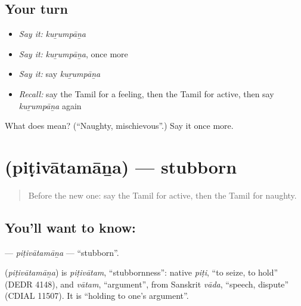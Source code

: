 \subsection*{Your turn}
\begin{itemize}
\raggedright
  \item \emph{Say it:} \emph{kuṟumpāṉa}
  \item \emph{Say it:} \emph{kuṟumpāṉa}, once more
  \item \emph{Say it:} say \emph{kuṟumpāṉa}
  \item \emph{Recall:} say the Tamil for a feeling, then the Tamil for active, then say \emph{kuṟumpāṉa} again
\end{itemize}

\begin{tcolorbox}[breakable,colback=teal!4,colframe=teal!35!black,title={Before you move on}]
What does  mean? (\textquotedblleft{}Naughty, mischievous\textquotedblright{}.) Say it once more.
\end{tcolorbox}
\section[\texorpdfstring{\ta{பிடிவாதமான} (piṭivātamāṉa)}{பிடிவாதமான (piṭivātamāṉa)}]{ (piṭivātamāṉa) — stubborn}

\label{lesson:TA-C180-pitivatamana}



\begin{quote}
Before the new one: say the Tamil for active, then the Tamil for naughty.
\end{quote}

\subsection*{You'll want to know: }
\textbf{} — \emph{piṭivātamāṉa} — \textquotedblleft{}stubborn\textquotedblright{}.

\begin{cousinweb}
\textbf{} (\emph{piṭivātamāṉa}) is \emph{piṭivātam}, \textquotedblleft{}stubbornness\textquotedblright{}: native \emph{piṭi}, \textquotedblleft{}to seize, to hold\textquotedblright{} (DEDR 4148), and \emph{vātam}, \textquotedblleft{}argument\textquotedblright{}, from Sanskrit \emph{vāda}, \textquotedblleft{}speech, dispute\textquotedblright{} (CDIAL 11507). It is \textquotedblleft{}holding to one's argument\textquotedblright{}.
\end{cousinweb}

